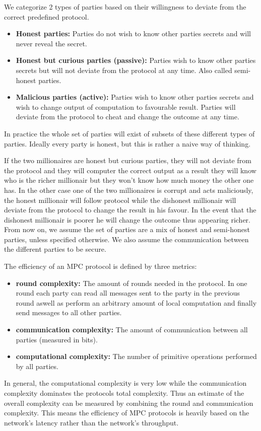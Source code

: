 We categorize 2 types of parties based on their willingness to deviate from the correct predefined protocol.
\begin{itemize}
  \item \textbf{Honest parties:} Parties do not wish to know other parties secrets and will never reveal the secret.
  \item \textbf{Honest but curious parties (passive):} Parties wish to know other parties secrets but will not deviate from the protocol at any time. Also called semi-honest parties.
  \item \textbf{Malicious parties (active):} Parties wish to know other parties secrets and wish to change output of computation to favourable result. Parties will deviate from the protocol to cheat and change the outcome at any time.
\end{itemize}
In practice the whole set of parties will exist of subsets of these different types of parties. Ideally every party is honest, but this is rather a naive way of thinking.


If the two millionaires are honest but curious parties, they will not deviate from the protocol and they will computer the correct output as a result they will know who is the richer millionair but they won't know how much money the other one has. In the other case one of the two millionaires is corrupt and acts maliciously, the honest millionair will follow protocol while the dishonest millionair will deviate from the protocol to change the result in his favour. In the event that the dishonest millionair is poorer he will change the outcome thus appearing richer.
From now on, we assume the set of parties are a mix of honest and semi-honest parties, unless specified otherwise. We also assume the communication between the different parties to be secure.

The efficiency of an MPC protocol is defined by three metrics:
\begin{itemize}
  \item \textbf{round complexity:} The amount of rounds needed in the protocol. In one round each party can read all messages sent to the party in the previous round aswell as perform an arbitrary amount of local computation and finally send messages to all other parties.
  \item \textbf{communication complexity:} The amount of communication between all parties (measured in bits).
  \item \textbf{computational complexity:} The number of primitive operations performed by all parties.
\end{itemize}
In general, the computational complexity is very low while the communication complexity dominates the protocols total complexity. Thus an estimate of the overall complexity can be measured by combining the round and communication complexity. This means the efficiency of MPC protocols  is heavily based on the network's latency rather than the network's throughput.

